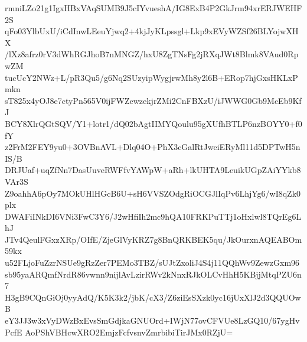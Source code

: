 rmniLZo21g1IgxHBxVAqSUMB9J5cIYvueshA/IG8ExB4P2GkJrm94xrERJWEHF2S
qFo03YlbUxU/iCdInwLEeuYjwq2+4kjJyKLpssgl+Lkp9xEVyWZSf26BLYojwXHX
/lXz8afrz0rV3dWhRGJhoB7nMNGZ/hxU8ZgTNsFg2jRXqJWt8Blmk8VAud0RpwZM
tucUcY2NWz+L/pR3Qu5/g6Nq2SUzyipWygjrwMh8y2l6B+ERop7hjGxsHKLxPmkn
sT825x4yOJ8e7ctyPn565V0ijFWZewzekjrZMi2CnFBXzU/iJWWG0Gb9McEb9KfJ
BCY8XlrQGtSQV/Y1+lotr1/dQ02bAgtIIMYQoulu95gXUfhBTLP6nzBOYY0+f0fY
z2FrM2FEY9yu0+3OVBnAVL+Dlq04O+PhX3cGalRtJweiERyMl11d5DPTwH5nIS/B
DRJUaf+uqZfNn7DasUuveRWFfvYAWpW+aRh+lkUHTA9LeuikUGpZAiYYkb8VAr3S
Z9oahhA6pOy7MOkUHlHGcB6U+sH6VVSZOdgRiOCGJlIqPv6LhjYg6/wI8qZk0plx
DWAFiINkDI6VNi3FwC3Y6/J2wHfiIh2mc9hQA10FRKPuTTj1oHxlwl8TQrEg6LhJ
JTv4QeulFGxzXRp/OIfE/ZjeGlVyKRZ7g8BnQRKBEK5qu/JkOurxnAQEABOm59kx
u52FLjoFuZzrNSUe9gRzZer7PEMo3TBZ/sUJtZxoliJ4S4j11QQhWv9ZewzGxm96
sb95yaARQmfNrdR86vwnn9nijlAvLzirRWv2kNnxRJkOLCvHhH5KBjjMtqPZU6n7
H3gB9CQnGiOj0yyAdQ/K5K3k2/jbK/cX3/Z6ziEsSXzk0yc16jUxXlJ2d3QQUOwB
eY3JJ3w3xVyDWzBxEvsSmGdjkaGNUOrd+IWjN77ovCFVUe8LzGQ10/67ygHvPcfE
AoPShVBHcwXRO2EmjzFcfvsnvZmrbibiTirJMx0RZjU=
